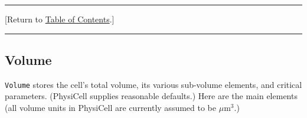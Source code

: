 \documentclass[12pt]{article}
\newcommand{\micron}{\mu\textrm{m}}
\renewcommand{\v}{\verb}
\newcommand{\blue}[1]{\textcolor{blue}{#1}}
\newcommand{\DONE}{}%
\newcommand{\TOClink}{\begin{center}\hrule\vskip-5pt\phantom{.}\hfill[Return to \hyperlink{TOC}{Table of Contents}.]\hfill\phantom{.}\vskip3pt\hrule\end{center}}
\begin{document}


\TOClink 

\subsection{Volume \DONE}
\label{sec:Volume}
\v|Volume| stores the cell's total volume, its various sub-volume elements, and critical 
parameters. %
(PhysiCell supplies reasonable defaults.) Here are the main elements (all volume units 
in PhysiCell are currently assumed to be $\micron^3$.)  
\end{document}
